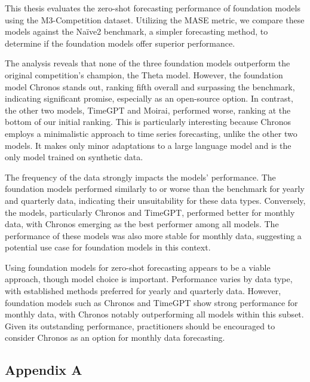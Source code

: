 \documentclass[12pt,a4paper]{article}
\begin{document}
This thesis evaluates the zero-shot forecasting performance of foundation models using the M3-Competition dataset. Utilizing the MASE metric, we compare these models against the Naïve2 benchmark, a simpler forecasting method, to determine if the foundation models offer superior performance.

The analysis reveals that none of the three foundation models outperform the original competition's champion, the Theta model. However, the foundation model Chronos stands out, ranking fifth overall and surpassing the benchmark, indicating significant promise, especially as an open-source option. In contrast, the other two models, TimeGPT and Moirai, performed worse, ranking at the bottom of our initial ranking. This is particularly interesting because Chronos employs a minimalistic approach to time series forecasting, unlike the other two models. It makes only minor adaptations to a large language model and is the only model trained on synthetic data.

The frequency of the data strongly impacts the models' performance. The foundation models performed similarly to or worse than the benchmark for yearly and quarterly data, indicating their unsuitability for these data types. Conversely, the models, particularly Chronos and TimeGPT, performed better for monthly data, with Chronos emerging as the best performer among all models. The performance of these models was also more stable for monthly data, suggesting a potential use case for foundation models in this context.

Using foundation models for zero-shot forecasting appears to be a viable approach, though model choice is important. Performance varies by data type, with established methods preferred for yearly and quarterly data. However, foundation models such as Chronos and TimeGPT show strong performance for monthly data, with Chronos notably outperforming all models within this subset. Given its outstanding performance, practitioners should be encouraged to consider Chronos as an option for monthly data forecasting. 


\newpage
\printbibliography{}

\newpage
\begin{center}
\item  \section*{Appendix A} \label{appendix_a}
\end{center}
\end{document}
